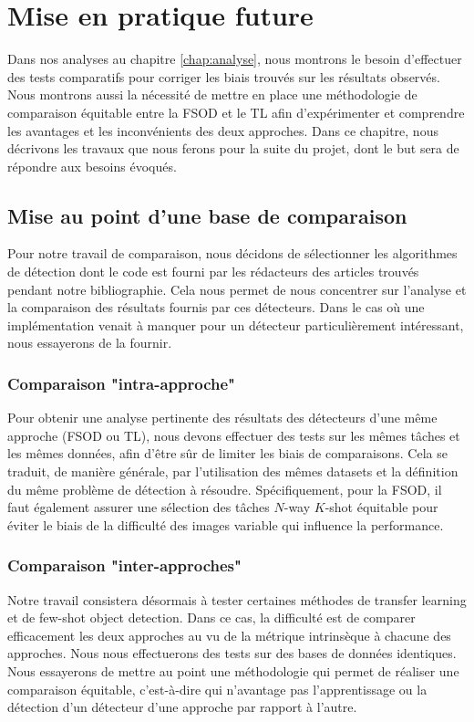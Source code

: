 \chapter{Mise en pratique future}
\label{chap:future-works}
Dans nos analyses au chapitre \ref{chap:analyse}, nous montrons le besoin d'effectuer des tests comparatifs pour corriger les biais trouvés sur les résultats observés. Nous montrons aussi la nécessité de mettre en place une méthodologie de comparaison équitable entre la FSOD et le TL afin d'expérimenter et comprendre les avantages et les inconvénients des deux approches. Dans ce chapitre, nous décrivons les travaux que nous ferons pour la suite du projet, dont le but sera de répondre aux besoins évoqués.

\section{Mise au point d'une base de comparaison}
Pour notre travail de comparaison, nous décidons de sélectionner les algorithmes de détection dont le code est fourni par les rédacteurs des articles trouvés pendant notre bibliographie. Cela nous permet de nous concentrer sur l'analyse et la comparaison des résultats fournis par ces détecteurs. Dans le cas où une implémentation venait à manquer pour un détecteur particulièrement intéressant, nous essayerons de la fournir.

\subsection{Comparaison "intra-approche"}
Pour obtenir une analyse pertinente des résultats des détecteurs d'une même approche (FSOD ou TL), nous devons effectuer des tests sur les mêmes tâches et les mêmes données, afin d'être sûr de limiter les biais de comparaisons. Cela se traduit, de manière générale, par l'utilisation des mêmes datasets et la définition du même problème de détection à résoudre. Spécifiquement, pour la FSOD, il faut également assurer une sélection des tâches $N$-way $K$-shot équitable pour éviter le biais de la difficulté des images variable qui influence la performance. %

\subsection{Comparaison "inter-approches"}
Notre travail consistera désormais à tester certaines méthodes de transfer learning et de few-shot object detection. Dans ce cas, la difficulté est de comparer efficacement les deux approches au vu de la métrique intrinsèque à chacune des approches. Nous nous effectuerons des tests sur des bases de données identiques. Nous essayerons de mettre au point une méthodologie qui permet de réaliser une comparaison équitable, c'est-à-dire qui n'avantage pas l'apprentissage ou la détection d'un détecteur d'une approche par rapport à l'autre.

